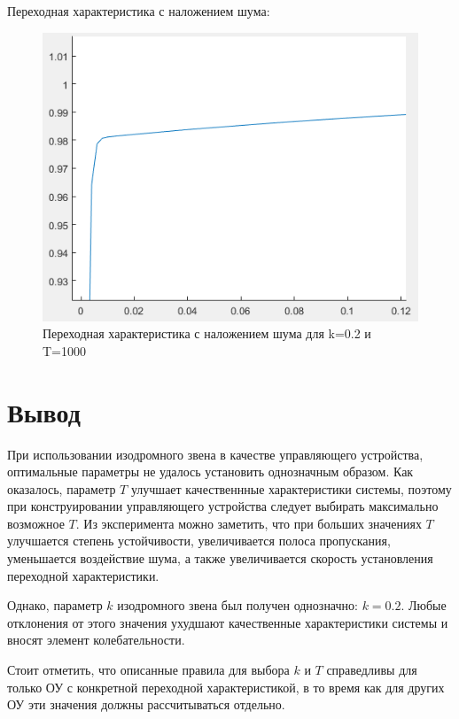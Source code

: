 \documentclass[14pt,a4paper,report]{report}
\begin{document}
Переходная характеристика с наложением шума:

\begin{figure}[h!]
	\centering
	\includegraphics[scale = 0.70]{images/stepnoice1000.png}
	\caption{Переходная характеристика с наложением шума для k=0.2 и T=1000}
	\label{image:9}
\end{figure}


\section{Вывод}

При использовании изодромного звена в качестве управляющего устройства, оптимальные параметры не удалось установить однозначным образом. Как оказалось, параметр $T$ улучшает качественнные характеристики системы, поэтому при конструировании управляющего устройства следует выбирать максимально возможное $T$. Из эксперимента можно заметить, что при больших значениях $T$ улучшается степень устойчивости, увеличивается полоса пропускания, уменьшается воздействие шума, а также увеличивается скорость установления переходной характеристики.

Однако, параметр $k$ изодромного звена был получен однозначно: $k=0.2$. Любые отклонения от этого значения ухудшают качественные характеристики системы и вносят элемент колебательности.

Стоит отметить, что описанные правила для выбора $k$ и $T$ справедливы для только ОУ с конкретной переходной характеристикой, в то время как для других ОУ эти значения должны рассчитываться отдельно.
\end{document}
